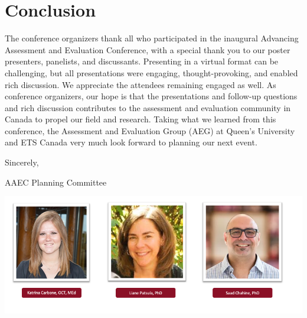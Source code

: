 \documentclass[
]{book}
\begin{document}
\newpage

\hypertarget{conclusion}{%
\chapter*{Conclusion}\label{conclusion}}

The conference organizers thank all who participated in the inaugural Advancing Assessment and Evaluation Conference, with a special thank you to our poster presenters, panelists, and discussants. Presenting in a virtual format can be challenging, but all presentations were engaging, thought-provoking, and enabled rich discussion. We appreciate the attendees remaining engaged as well. As conference organizers, our hope is that the presentations and follow-up questions and rich discussion contributes to the assessment and evaluation community in Canada to propel our field and research. Taking what we learned from this conference, the Assessment and Evaluation Group (AEG) at Queen's University and ETS Canada very much look forward to planning our next event.

Sincerely,

AAEC Planning Committee

\includegraphics{Content/PC.png}

\newpage

  
\end{document}
